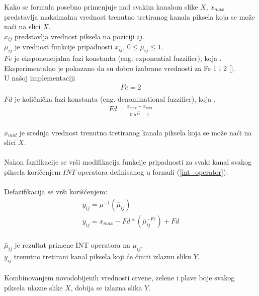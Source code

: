 \documentclass[12pt,a4paper]{article}
\theoremstyle{definition}
\theoremstyle{remark}
\theoremstyle{plain}
\begin{document}
Kako se formula posebno primenjuje nad svakim kanalom slike $X$, $x_{max}$ predstavlja maksimalnu vrednost trenutno tretiranog kanala piksela koja se mo\v ze na\' ci na slici $X$.\\
$x_{ij}$ predstavlja vrednost piksela na poziciji $ij$. \\ 
$\mu_{ij}$ je vrednost funkcije pripadnosti $x_{ij}$, $0\leq \mu_{ij} \leq 1$.\\
$Fe$ je eksponencijalna fazi konstanta (eng. exponential fuzzifier), koja . \\
Eksperimentalno je pokazano da su dobro izabrane vrednosti za Fe 1 i 2 []. \\
U na\v soj implementaciji 
\begin{align*}
  Fe = 2\\
\end{align*}
$Fd$ je koli\v cni\v cka fazi konstanta (eng. denominational fuzzifier), koja . \\
\begin{align*}
  Fd = \frac{x_{max} - x_{mid}}{0.5^{\frac{-1}{Fe}} - 1}
\end{align*}
\\
$x_{mid}$ je srednja vrednost trenutno tretiranog kanala piksela koja se mo\v ze na\' ci na slici $X$. \\ \\
Nakon fazifikacije se vr\v si modifikacija funkcije pripadnosti za svaki kanal svakog piksela kori\v \' cenjem $INT$ operatora definisanog u formuli (\ref{int_operator}).\\
\\
Defazifikacija se vr\v si kori\v s\' cenjem:\\
\begin{align*}
  y_{ij} = \mu^{-1}(\bar\mu_{ij})\\
  y_{ij} = x_{max} - Fd * (\bar\mu_{ij}^{-Fe}) + Fd\\
\end{align*}

$\bar\mu_{ij}$ je rezultat primene INT operatora n\mbox a $\mu_{ij}$. \\
$y_{ij}$ trenutno tretirani kanal piksela koji \' ce \v ciniti izlaznu sliku $Y$.\\
\\
Kombinovanjem novodobijenih vrednosti crvene, zelene i plave boje svakog piksela ulazne slike $X$, dobija se izlazna slika $Y$.

\inputminted[tabsize=2,breaklines]{cpp}{codes/latex/fuzzy_color_latex.cpp}
\end{document}
